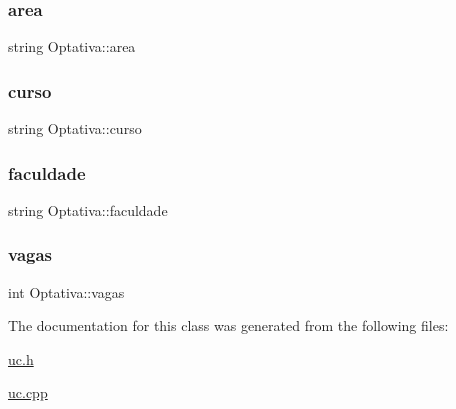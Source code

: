 \subsubsection{\texorpdfstring{area}{area}}
{\footnotesize\ttfamily string Optativa\+::area\hspace{0.3cm}{\ttfamily [private]}}

\hypertarget{class_optativa_a16a774ceaeb9ff2e4755540e01ee7a03}{}\label{class_optativa_a16a774ceaeb9ff2e4755540e01ee7a03} 
\subsubsection{\texorpdfstring{curso}{curso}}
{\footnotesize\ttfamily string Optativa\+::curso\hspace{0.3cm}{\ttfamily [private]}}

\hypertarget{class_optativa_aba2a76842ec9cf99d8ee4f6b5ad37019}{}\label{class_optativa_aba2a76842ec9cf99d8ee4f6b5ad37019} 
\subsubsection{\texorpdfstring{faculdade}{faculdade}}
{\footnotesize\ttfamily string Optativa\+::faculdade\hspace{0.3cm}{\ttfamily [private]}}

\hypertarget{class_optativa_a7502cd3259bb95dd8ceb3af9a8eb326a}{}\label{class_optativa_a7502cd3259bb95dd8ceb3af9a8eb326a} 
\subsubsection{\texorpdfstring{vagas}{vagas}}
{\footnotesize\ttfamily int Optativa\+::vagas\hspace{0.3cm}{\ttfamily [private]}}



The documentation for this class was generated from the following files\+:\begin{DoxyCompactItemize}
\item 
\hyperlink{uc_8h}{uc.\+h}\item 
\hyperlink{uc_8cpp}{uc.\+cpp}\end{DoxyCompactItemize}
